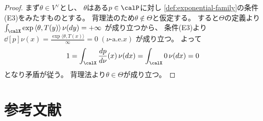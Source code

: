\documentclass[report]{jlreq}
\begin{document}
\begin{proof}
    まず$\theta \in V^\vee$とし、
    $\theta$はある$p \in \calP$に対し
    \cref{def:exponential-family}の条件(E3)をみたすものとする。
    背理法のため$\theta \notin \Theta$と仮定する。
    すると$\Theta$の定義より
    $\int_\calX \exp{\langle \theta, T(y) \rangle} \, \nu(dy) = +\infty$
    が成り立つから、
    条件(E3)より
    $\dd[p]{\nu}(x) = \frac{\exp{\langle \theta, T(x) \rangle}}{\infty} = 0 \;
        (\text{$\nu$-a.e.$x$})$
    が成り立つ。
    よって
    \begin{equation}
        1 = \int_\calX \dd[p]{\nu}(x) \, \nu(dx)
            = \int_\calX 0 \, \nu(dx)
            = 0
    \end{equation}
    となり矛盾が従う。
    背理法より$\theta \in \Theta$が成り立つ。
\end{proof}


%
\section{参考文献}

\nocite{amari_information_2016}
\nocite{wainwright_graphical_2007}
\nocite{bn1970_pdf}

{
    \renewcommand{\bibsection}{}
    
    
}
\end{document}
